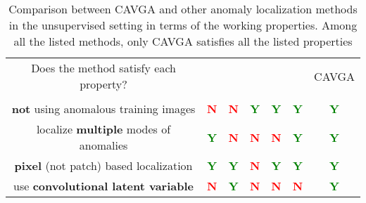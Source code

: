 \documentclass[runningheads]{llncs}
\newcommand{\red}[1]{\textcolor{red}{#1}}
\newcommand{\green}[1]{\textcolor{green}{#1}}
\begin{document}
\begin{table}[t]
\begin{center}
\setlength{\tabcolsep}{4.0pt}
\scriptsize
\caption{
Comparison between CAVGA and other anomaly localization methods in the unsupervised setting in terms of the working properties. Among all the listed methods, only CAVGA satisfies all the listed properties 
} 
\label{table_related_works}
\begin{tabular}{ccccccc}
\toprule
		Does the method satisfy each property? &\cite{akcay2018ganomaly,schlegl2017unsupervised} & \cite{baur2018deep}  &\cite{sabokrou2018avid}  &\cite{wang2019pathology}  &\cite{dehaene2020iterative,liu2019towards}   &CAVGA\\
		& \cite{ravanbakhsh2019training, bergmann2018improving} & &  &\cite{smilkov2017smoothgrad}  &\cite{abati2019latent}  &\\
\midrule
		\textbf{not} using anomalous training images &\red{\textbf{N}} & \red{\textbf{N}} &\green{\textbf{Y}}  &\green{\textbf{\textbf{Y}}} &\green{\textbf{Y}} &\green{\textbf{Y}} \\ 
		
	\noindent localize \textbf{multiple} modes of anomalies &\green{\textbf{Y}} & \red{\textbf{N}} &\red{\textbf{N}}  &\red{\textbf{N}}  &\green{\textbf{Y}}  &\green{\textbf{Y}}\\ 
	\noindent \textbf{pixel} (not patch) based localization    &\green{\textbf{Y}} & \green{\textbf{Y}} &\red{\textbf{N}}  &\green{\textbf{Y}}  &\green{\textbf{Y}}   &\green{\textbf{Y}}\\ 
	\noindent use \textbf{convolutional latent variable} &\red{\textbf{N}} & \green{\textbf{Y}}  &\red{\textbf{N}}  &\red{\textbf{N}}  &\red{\textbf{N}}  &\green{\textbf{Y}}\\
\bottomrule
\end{tabular}
\end{center}
\end{table}
\end{document}
